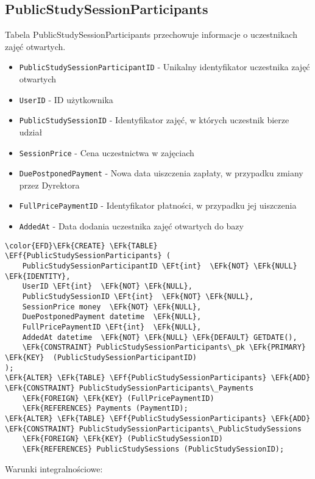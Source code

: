 \documentclass[11pt]{article}
\newcommand{\EFk}[1]{\textcolor{EFk}{\textbf{#1}}} %
\newcommand{\EFf}[1]{\textcolor{EFf}{#1}} %
\newcommand{\EFt}[1]{\textcolor{EFt}{\textbf{#1}}} %
\begin{document}
\subsection{PublicStudySessionParticipants}
\label{sec:org782e313}
Tabela PublicStudySessionParticipants przechowuje informacje o uczestnikach zajęć otwartych.
\begin{itemize}
\item \texttt{PublicStudySessionParticipantID} - Unikalny identyfikator uczestnika zajęć otwartych
\item \texttt{UserID} - ID użytkownika
\item \texttt{PublicStudySessionID} - Identyfikator zajęć, w których uczestnik bierze udział
\item \texttt{SessionPrice} - Cena uczestnictwa w zajęciach
\item \texttt{DuePostponedPayment} - Nowa data uiszczenia zapłaty, w przypadku zmiany przez Dyrektora
\item \texttt{FullPricePaymentID} - Identyfikator płatności, w przypadku jej uiszczenia
\item \texttt{AddedAt} - Data dodania uczestnika zajęć otwartych do bazy
\end{itemize}
\begin{Code}
\begin{Verbatim}
\color{EFD}\EFk{CREATE} \EFk{TABLE} \EFf{PublicStudySessionParticipants} (
    PublicStudySessionParticipantID \EFt{int}  \EFk{NOT} \EFk{NULL} \EFk{IDENTITY},
    UserID \EFt{int}  \EFk{NOT} \EFk{NULL},
    PublicStudySessionID \EFt{int}  \EFk{NOT} \EFk{NULL},
    SessionPrice money  \EFk{NOT} \EFk{NULL},
    DuePostponedPayment datetime  \EFk{NULL},
    FullPricePaymentID \EFt{int}  \EFk{NULL},
    AddedAt datetime  \EFk{NOT} \EFk{NULL} \EFk{DEFAULT} GETDATE(),
    \EFk{CONSTRAINT} PublicStudySessionParticipants\_pk \EFk{PRIMARY} \EFk{KEY}  (PublicStudySessionParticipantID)
);
\EFk{ALTER} \EFk{TABLE} \EFf{PublicStudySessionParticipants} \EFk{ADD} \EFk{CONSTRAINT} PublicStudySessionParticipants\_Payments
    \EFk{FOREIGN} \EFk{KEY} (FullPricePaymentID)
    \EFk{REFERENCES} Payments (PaymentID);
\EFk{ALTER} \EFk{TABLE} \EFf{PublicStudySessionParticipants} \EFk{ADD} \EFk{CONSTRAINT} PublicStudySessionParticipants\_PublicStudySessions
    \EFk{FOREIGN} \EFk{KEY} (PublicStudySessionID)
    \EFk{REFERENCES} PublicStudySessions (PublicStudySessionID);
\end{Verbatim}
\end{Code}
Warunki integralnościowe:
\end{document}
